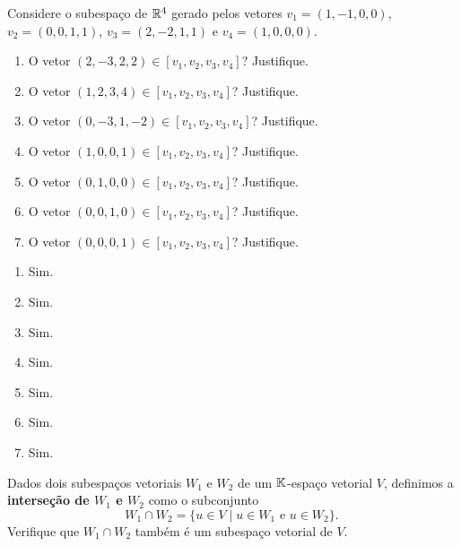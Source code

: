 \documentclass[12pt]{exam}
\begin{document}
\begin{exercicio}
  Considere o subespaço de $\mathbb{R}^4$ gerado pelos vetores $v_1 = (1, -1, 0, 0)$, $v_2 = (0, 0, 1, 1)$, $v_3 = (2, -2, 1, 1)$ e $v_4 = (1, 0, 0, 0)$.
  \begin{enumerate}[label={\alph*})]
    \item O vetor $(2, -3, 2, 2) \in [v_1, v_2, v_3, v_4]$? Justifique.

    \item O vetor $(1, 2, 3, 4) \in [v_1, v_2, v_3, v_4]$? Justifique.

    \item O vetor $(0, -3, 1, -2) \in [v_1, v_2, v_3, v_4]$? Justifique.

    \item O vetor $(1, 0, 0, 1) \in [v_1, v_2, v_3, v_4]$? Justifique.

    \item O vetor $(0, 1, 0, 0) \in [v_1, v_2, v_3, v_4]$? Justifique.

    \item O vetor $(0, 0, 1, 0) \in [v_1, v_2, v_3, v_4]$? Justifique.

    \item O vetor $(0, 0, 0, 1) \in [v_1, v_2, v_3, v_4]$? Justifique.
  \end{enumerate}
  \begin{solucao}
    \begin{multicols}{3}
      \begin{enumerate}[label={\alph*})]
        \item Sim.

        \item Sim.

        \item Sim.

        \item Sim.

        \item Sim.

        \item Sim.

        \item Sim.
      \end{enumerate}
    \end{multicols}
  \end{solucao}
\end{exercicio}

\begin{exercicio}
    Dados dois subespaços vetoriais $W_1$ e $W_2$ de um $\mathbb{K}$-espaço vetorial $V$, definimos a \textbf{interseção de $W_1$ e $W_2$} como o subconjunto
    \[
        W_1 \cap W_2 = \{u \in V \mid u\in W_1 \mbox{ e } u \in W_2\}.\
    \]
    Verifique que $W_1 \cap W_2$ também é um subespaço vetorial de $V$.
\end{exercicio}
\end{document}
